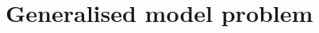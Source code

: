 \documentclass[../main.tex]{subfiles}
\begin{document}
\section{Generalised model problem}

\blindtext
\end{document}
